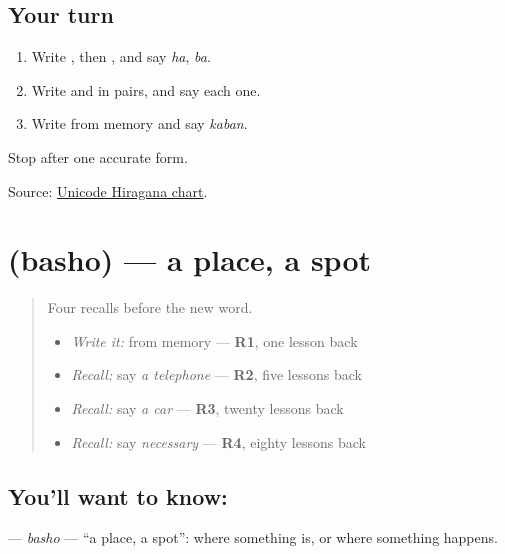 \subsection*{Your turn}
\begin{enumerate}
\raggedright
  \item Write \textbf{}, then \textbf{}, and say \emph{ha}, \emph{ba}.
  \item Write \textbf{ } and \textbf{ } in pairs, and say each one.
  \item Write \textbf{} from memory and say \emph{kaban}.
\end{enumerate}

\begin{tcolorbox}[breakable,colback=teal!4,colframe=teal!35!black,title={Before you move on}]
Stop after one accurate form.

Source: \href{https://www.unicode.org/charts/PDF/U3040.pdf}{Unicode Hiragana chart}.
\end{tcolorbox}
\section[\texorpdfstring{\ja{ばしょ} (basho)}{ばしょ (basho)}]{ (basho) — a place, a spot}

\label{lesson:JA-C134-basho}



\begin{quote}
Four recalls before the new word.

\begin{itemize}
\raggedright
  \item \emph{Write it:} \textbf{} from memory — \textbf{R1}, one lesson back
  \item \emph{Recall:} say \emph{a telephone} — \textbf{R2}, five lessons back
  \item \emph{Recall:} say \emph{a car} — \textbf{R3}, twenty lessons back
  \item \emph{Recall:} say \emph{necessary} — \textbf{R4}, eighty lessons back
\end{itemize}
\end{quote}

\subsection*{You'll want to know: }
\textbf{} — \emph{basho} — \textquotedblleft{}a place, a spot\textquotedblright{}: where something is, or where something happens.

